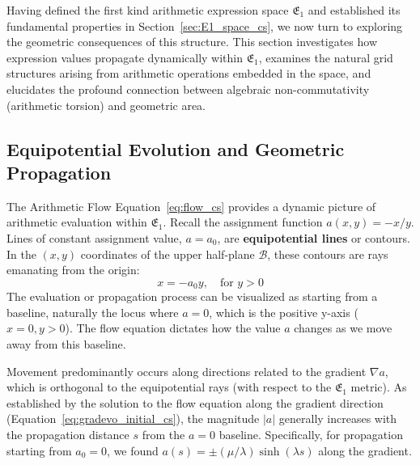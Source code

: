 \documentclass[12pt]{article}
\begin{document}
Having defined the first kind arithmetic expression space \( \mathfrak{E}_1 \) and established its fundamental properties in Section~\ref{sec:E1_space_cs}, %
we now turn to exploring the geometric consequences of this structure. This section investigates how expression values propagate dynamically within \( \mathfrak{E}_1 \), examines the natural grid structures arising from arithmetic operations embedded in the space, and elucidates the profound connection between algebraic non-commutativity (arithmetic torsion) and geometric area.

\subsection{Equipotential Evolution and Geometric Propagation} %

The Arithmetic Flow Equation~\eqref{eq:flow_cs} provides a dynamic picture of arithmetic evaluation within \( \mathfrak{E}_1 \). Recall the assignment function \( a(x, y) = -x/y \). Lines of constant assignment value, \( a = a_0 \), are \textbf{equipotential lines} or contours. In the \( (x, y) \) coordinates of the upper half-plane \( \mathcal{B} \), these contours are rays emanating from the origin:
\[
x = -a_0 y, \quad \text{for } y > 0
\]
The evaluation or propagation process can be visualized as starting from a baseline, naturally the locus where \( a = 0 \), which is the positive y-axis (\( x = 0, y > 0 \)). The flow equation dictates how the value \( a \) changes as we move away from this baseline.

Movement predominantly occurs along directions related to the gradient \( \nabla a \), which is orthogonal to the equipotential rays (with respect to the \( \mathfrak{E}_1 \) metric). As established by the solution to the flow equation along the gradient direction (Equation~\eqref{eq:gradevo_initial_cs}), the magnitude \( |a| \) generally increases with the propagation distance \( s \) from the \( a=0 \) baseline. Specifically, for propagation starting from \( a_0=0 \), we found \( a(s) = \pm (\mu/\lambda) \sinh(\lambda s) \) along the gradient.
\end{document}
